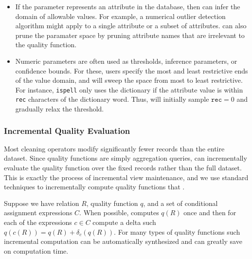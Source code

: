 \begin{itemize}[leftmargin=*,topsep=.3em,itemsep=-.2em,partopsep=-.5em]
  \item {} If the parameter represents an attribute in the database, then \sys can infer the domain of allowable values.   For example, a numerical outlier detection algorithm might apply to a single attribute or a subset of attributes. \sys can also prune the paramater space by pruning attribute names that are irrelevant to the quality function.  

  \item {} Numeric parameters are often used as thresholds, inference parameters, or confidence bounds.  For these, users specify the most and least restrictive ends of the value domain, and \sys will sweep the space from most to least restrictive.   For instance, \texttt{ispell} only uses the dictionary if the attribute value is within \texttt{rec} characters of the dictionary word.  Thus, \sys will initially sample $\texttt{rec}=0$ and gradually relax the threshold.   
\end{itemize}



\subsubsection{Incremental Quality Evaluation}

Most cleaning operators modify significantly fewer records than the entire dataset.  Since quality functions are simply aggregation queries, \sys can incrementally evaluate the quality function over the fixed records rather than the full dataset.  
This is exactly the process of incremental view maintenance, and we use standard techniques to incrementally compute quality functions that .  

Suppose we have relation $R$, quality function $q$, and a set of conditional assignment expressions $C$.  When possible, \sys computes $q(R)$ once and then for each of the expressions $c \in C$ compute a delta such $q(c(R)) = q(R) + \delta_c(q(R))$.
For many types of quality functions such incremental computation can be automatically synthesized and can greatly save on computation time.

